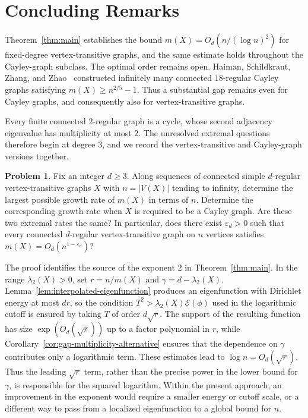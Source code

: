 \documentclass[11pt]{article}
\theoremstyle{definition}
\newtheorem{problem}[theorem]{Problem}
\theoremstyle{remark}
\begin{document}
\section{Concluding Remarks}\label{sec:concluding-remarks}

Theorem~\ref{thm:main} establishes the bound $m(X)=O_d(n/(\log n)^2)$ for fixed-degree vertex-transitive graphs, and the same estimate holds throughout the Cayley-graph subclass. The optimal order remains open. Haiman, Schildkraut, Zhang, and Zhao~\cite[Theorem~1.5]{HaimanSchildkrautZhangZhao2022HighMultiplicity} constructed infinitely many connected $18$-regular Cayley graphs satisfying $m(X)\geq n^{2/5}-1$. Thus a substantial gap remains even for Cayley graphs, and consequently also for vertex-transitive graphs.

Every finite connected $2$-regular graph is a cycle, whose second adjacency eigenvalue has multiplicity at most $2$. The unresolved extremal questions therefore begin at degree $3$, and we record the vertex-transitive and Cayley-graph versions together.

\begin{problem}\label{prob:optimal-transitive-multiplicity}
Fix an integer $d\geq3$. Along sequences of connected simple $d$-regular vertex-transitive graphs $X$ with $n=|V(X)|$ tending to infinity, determine the largest possible growth rate of $m(X)$ in terms of $n$. Determine the corresponding growth rate when $X$ is required to be a Cayley graph. Are these two extremal rates the same? In particular, does there exist $\varepsilon_d>0$ such that every connected $d$-regular vertex-transitive graph on $n$ vertices satisfies $m(X)=O_d(n^{1-\varepsilon_d})$?
\end{problem}

The proof identifies the source of the exponent $2$ in Theorem~\ref{thm:main}. In the range $\lambda_2(X)>0$, set $r=n/m(X)$ and $\gamma=d-\lambda_2(X)$. Lemma~\ref{lem:interpolated-eigenfunction} produces an eigenfunction with Dirichlet energy at most $dr$, so the condition $T^2>\lambda_2(X)\mathcal E(\phi)$ used in the logarithmic cutoff is ensured by taking $T$ of order $d\sqrt r$. The support of the resulting function has size $\exp(O_d(\sqrt r))$ up to a factor polynomial in $r$, while Corollary~\ref{cor:gap-multiplicity-alternative} ensures that the dependence on $\gamma$ contributes only a logarithmic term. These estimates lead to $\log n=O_d(\sqrt r)$. Thus the leading $\sqrt r$ term, rather than the precise power in the lower bound for $\gamma$, is responsible for the squared logarithm. Within the present approach, an improvement in the exponent would require a smaller energy or cutoff scale, or a different way to pass from a localized eigenfunction to a global bound for $n$.
\end{document}
